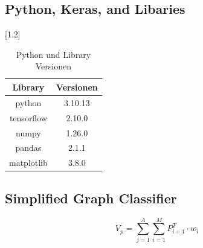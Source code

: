 \documentclass[12pt]{article}
\begin{document}
        \subsection{Python, Keras, and Libaries}
                
          
                
                
            \begin{table}[htp]

                \begin{center} 

                \scalebox{1.2}[1.2]{
                \begin{tabular}{ | c | c | }
                \hline
                \textbf{Library}    &       \textbf{Versionen} \\
                \hline
                python              &       3.10.13 \\ 
                tensorflow          &       2.10.0 \\
                numpy               &       1.26.0 \\
                pandas              &       2.1.1 \\
                matplotlib          &       3.8.0 \\
                
                \hline
                \end{tabular}
                }

                \caption{Python und Library Versionen}
                \label{pl-versionen}

                \end{center}

            \end{table}
       

        \subsection{Simplified Graph Classifier}

         

            \newpage
            \begin{Large} \[ V_p = \sum_{j=1}^{A}\sum_{i=1}^{M}P^T_{i+1} \cdot w_i \] \end{Large}
\end{document}
